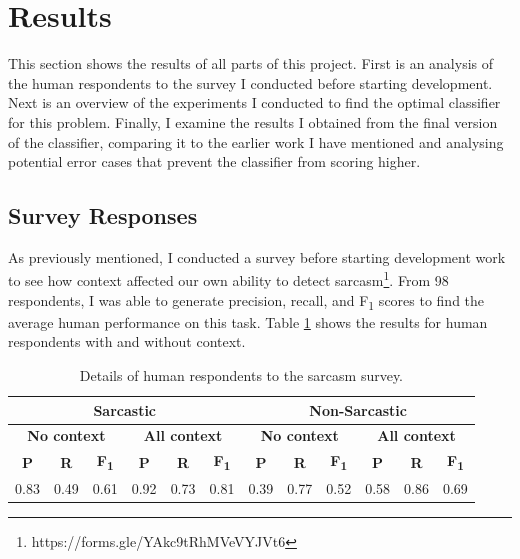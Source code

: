 \documentclass[a4paper,12pt]{article}
\let\stdsection\section
\renewcommand\section{\newpage\stdsection}
\begin{document}
\section{Results}
This section shows the results of all parts of this project. First is an analysis of the human respondents to the survey I conducted before starting development. Next is an overview of the experiments I conducted to find the optimal classifier for this problem. Finally, I examine the results I obtained from the final version of the classifier, comparing it to the earlier work I have mentioned and analysing potential error cases that prevent the classifier from scoring higher.

\subsection{Survey Responses}
As previously mentioned, I conducted a survey before starting development work to see how context affected our own ability to detect sarcasm\footnote{https://forms.gle/YAkc9tRhMVeVYJVt6}. From 98 respondents, I was able to generate precision, recall, and F\textsubscript{1} scores to find the average human performance on this task. Table \ref{tab:cmd2} shows the results for human respondents with and without context.

\begin{table}[h!]
\begin{tabular}{|c|c|c|c|c|c|c|c|c|c|c|c|}
\hline
\multicolumn{6}{|c|}{\textbf{Sarcastic}}                                                                      & \multicolumn{6}{c|}{\textbf{Non-Sarcastic}}                                                                   \\ \hline
\multicolumn{3}{|c|}{\textbf{No context}}             & \multicolumn{3}{c|}{\textbf{All context}}             & \multicolumn{3}{c|}{\textbf{No context}}              & \multicolumn{3}{c|}{\textbf{All context}}             \\ \hline
\textbf{P} & \textbf{R} & \textbf{F\textsubscript{1}} & \textbf{P} & \textbf{R} & \textbf{F\textsubscript{1}} & \textbf{P} & \textbf{R} & \textbf{F\textsubscript{1}} & \textbf{P} & \textbf{R} & \textbf{F\textsubscript{1}} \\ \hline
0.83       & 0.49       & 0.61                        & 0.92       & 0.73       & 0.81                        & 0.39       & 0.77       & 0.52                        & 0.58       & 0.86       & 0.69                        \\ \hline
\end{tabular}
\caption{Details of human respondents to the sarcasm survey.}
\label{tab:cmd2}
\end{table}
\end{document}
